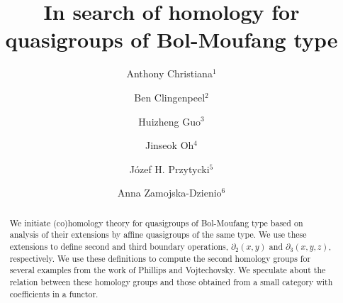 \documentclass[11pt]{amsart}
\theoremstyle{definition}
\begin{document}

\title[Homology of quasigroups of Bol-Moufang type]{In search of homology for quasigroups of Bol-Moufang type}
\author[Christiana]{Anthony Christiana$^1$}
\address{$^1$Department of Mathematics, The George Washington University, \newline \indent Washington DC, USA}

\author[Clingenpeel]{Ben Clingenpeel$^2$}
\address{$^2$Department of Mathematics, The George Washington University,\newline \indent Washington DC, USA}

\author[Guo]{Huizheng Guo$^3$} 
\address{$^3$Department of Mathematics, The George Washington University, \newline \indent Washington DC, USA}
\author[Oh]{Jinseok Oh$^4$}
\address{$^4$Department of Mathematics, Kyungpook National University, Daegu, \newline \indent South Korea}
\author[Przytycki]{J\'{o}zef H. Przytycki$^5$}
\address{$^5$Department of Mathematics, The George Washington University,\newline \indent Washington DC, USA and \newline \indent Department of Mathematics, University of Gda\'{n}sk, Gda\'{n}sk, Poland}

\author[Zamojska-Dzienio]{Anna Zamojska-Dzienio$^6$}
\address{$^6$Faculty of Mathematics and Information Science\\ Warsaw
University of\newline \indent Technology, 00-661 Warsaw, Poland}
\begin{abstract}
    We initiate (co)homology theory for quasigroups of Bol-Moufang type based on analysis of their extensions by affine quasigroups of the same type. We use these extensions to define second and third boundary operations, $\partial_2(x,y)$ and $\partial_3(x,y,z)$, respectively. We use these definitions to compute the second homology groups for several examples from the work of Phillips and Vojtechovsky. We speculate about the relation between these homology groups and those obtained from a small category with coefficients in a functor.
\end{abstract}
\maketitle
\tableofcontents
\end{document}
